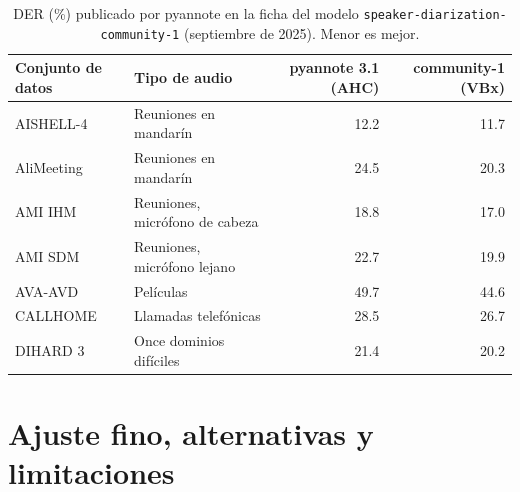 \documentclass[11pt,a4paper]{article}
\begin{document}
\begin{table}[ht]
\centering
\caption{DER (\%) publicado por pyannote en la ficha del modelo \texttt{speaker-diarization-community-1} (septiembre de 2025). Menor es mejor.}
\label{tab:der}
\begin{tabular}{llrr}
\toprule
Conjunto de datos & Tipo de audio & pyannote 3.1 (AHC) & community-1 (VBx) \\
\midrule
AISHELL-4 & Reuniones en mandarín & 12.2 & 11.7 \\
AliMeeting & Reuniones en mandarín & 24.5 & 20.3 \\
AMI IHM & Reuniones, micrófono de cabeza & 18.8 & 17.0 \\
AMI SDM & Reuniones, micrófono lejano & 22.7 & 19.9 \\
AVA-AVD & Películas & 49.7 & 44.6 \\
CALLHOME & Llamadas telefónicas & 28.5 & 26.7 \\
DIHARD 3 & Once dominios difíciles & 21.4 & 20.2 \\
\bottomrule
\end{tabular}
\end{table}

\section{Ajuste fino, alternativas y limitaciones}
\label{sec:contexto}
\end{document}
